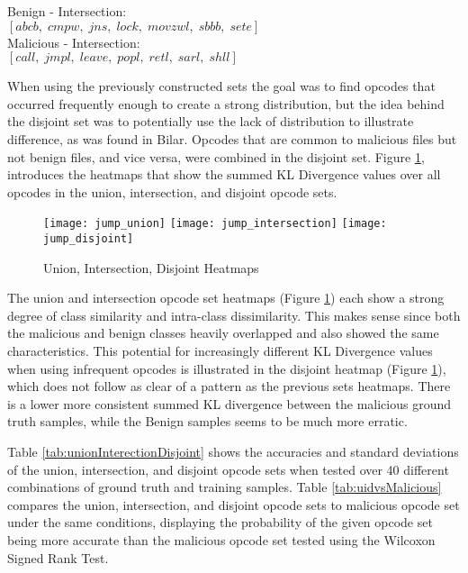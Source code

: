 \begin{center}
    Benign - Intersection:\\
    $[abcb,\; cmpw,\; jns,\; lock,\; movzwl,\; sbbb,\; sete]$\\
    Malicious - Intersection:\\
    $[call,\; jmpl,\; leave,\; popl,\; retl,\; sarl,\; shll]$
\end{center}

When using the previously constructed sets the goal was to find opcodes that occurred frequently enough to create
a strong distribution, but the idea behind the disjoint set was to potentially use the lack of distribution to
illustrate difference, as was found in Bilar\cite{bilar}.
Opcodes that are common to malicious files but not benign files, and vice versa, were combined in the disjoint set.
Figure \ref{fig:unionIntersectionDisjoint}, introduces the heatmaps that show the summed KL Divergence values over all
opcodes in the union, intersection, and disjoint opcode sets.

\begin{figure}[H]
    \centering
    \texttt{[image: jump\_union]}\hspace{1em}%
    \texttt{[image: jump\_intersection]}
    \texttt{[image: jump\_disjoint]}
    \centering
    \caption{
        Union, Intersection, Disjoint Heatmaps
    }
    \label{fig:unionIntersectionDisjoint}
\end{figure}

The union and intersection opcode set heatmaps (Figure \ref{fig:unionIntersectionDisjoint}) each show a strong
degree of class similarity and intra-class dissimilarity.
This makes sense since both the malicious and benign classes heavily overlapped and also showed the same
characteristics.
This potential for increasingly different KL Divergence values when using infrequent opcodes is illustrated in
the disjoint heatmap (Figure \ref{fig:unionIntersectionDisjoint}), which does not follow as clear of a pattern
as the previous sets heatmaps.
There is a lower more consistent summed KL divergence between the malicious ground truth samples, while the Benign
samples seems to be much more erratic.

Table \ref{tab:unionInterectionDisjoint} shows the accuracies and standard deviations of the union, intersection,
and disjoint opcode sets when tested over 40 different combinations of ground truth and training samples.
Table \ref{tab:uidvsMalicious} compares the union, intersection, and disjoint opcode sets to malicious opcode set
under the same conditions, displaying the probability of the given opcode set being more accurate than the malicious
opcode set tested using the Wilcoxon Signed Rank Test.

